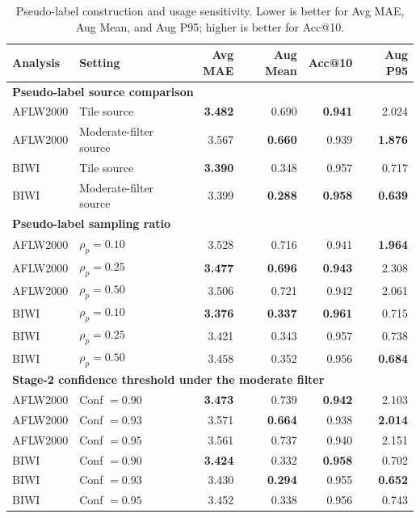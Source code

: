 \documentclass[preprint,12pt]{elsarticle}
\begin{document}
\begin{table}[h]
\centering
\caption{Pseudo-label construction and usage sensitivity. Lower is better for Avg MAE, Aug Mean, and Aug P95; higher is better for Acc@10.}
\label{tab:pseudo_usage_sensitivity}
\scriptsize
\setlength{\tabcolsep}{4pt}
\begin{tabular}{llrrrr}
\toprule
Analysis & Setting & Avg MAE & Aug Mean & Acc@10 & Aug P95 \\
\midrule
\multicolumn{6}{l}{\textbf{Pseudo-label source comparison}} \\
AFLW2000 & Tile source & \textbf{3.482} & 0.690 & \textbf{0.941} & 2.024 \\
AFLW2000 & Moderate-filter source & 3.567 & \textbf{0.660} & 0.939 & \textbf{1.876} \\
BIWI & Tile source & \textbf{3.390} & 0.348 & 0.957 & 0.717 \\
BIWI & Moderate-filter source & 3.399 & \textbf{0.288} & \textbf{0.958} & \textbf{0.639} \\
\midrule
\multicolumn{6}{l}{\textbf{Pseudo-label sampling ratio}} \\
AFLW2000 & $\rho_p=0.10$ & 3.528 & 0.716 & 0.941 & \textbf{1.964} \\
AFLW2000 & $\rho_p=0.25$ & \textbf{3.477} & \textbf{0.696} & \textbf{0.943} & 2.308 \\
AFLW2000 & $\rho_p=0.50$ & 3.506 & 0.721 & 0.942 & 2.061 \\
BIWI & $\rho_p=0.10$ & \textbf{3.376} & \textbf{0.337} & \textbf{0.961} & 0.715 \\
BIWI & $\rho_p=0.25$ & 3.421 & 0.343 & 0.957 & 0.738 \\
BIWI & $\rho_p=0.50$ & 3.458 & 0.352 & 0.956 & \textbf{0.684} \\
\midrule
\multicolumn{6}{l}{\textbf{Stage-2 confidence threshold under the moderate filter}} \\
AFLW2000 & Conf $=0.90$ & \textbf{3.473} & 0.739 & \textbf{0.942} & 2.103 \\
AFLW2000 & Conf $=0.93$ & 3.571 & \textbf{0.664} & 0.938 & \textbf{2.014} \\
AFLW2000 & Conf $=0.95$ & 3.561 & 0.737 & 0.940 & 2.151 \\
BIWI & Conf $=0.90$ & \textbf{3.424} & 0.332 & \textbf{0.958} & 0.702 \\
BIWI & Conf $=0.93$ & 3.430 & \textbf{0.294} & 0.955 & \textbf{0.652} \\
BIWI & Conf $=0.95$ & 3.452 & 0.338 & 0.956 & 0.743 \\
\bottomrule
\end{tabular}
\end{table}
\end{document}
